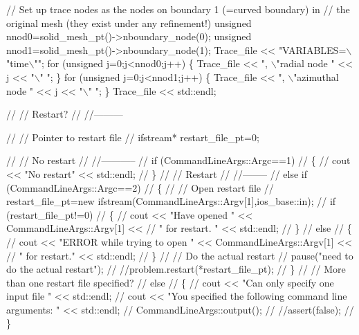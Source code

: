 \begin{DoxyCodeInclude}
{{{{{{{{{ \textcolor{comment}{// Set up trace nodes as the nodes on boundary 1 (=curved boundary) in }
 \textcolor{comment}{// the original mesh (they exist under any refinement!) }
 \textcolor{keywordtype}{unsigned} nnod0=solid\_mesh\_pt()->nboundary\_node(0);
 \textcolor{keywordtype}{unsigned} nnod1=solid\_mesh\_pt()->nboundary\_node(1);
 Trace\_file << \textcolor{stringliteral}{"VARIABLES=\(\backslash\)"time\(\backslash\)""};
 \textcolor{keywordflow}{for} (\textcolor{keywordtype}{unsigned} j=0;j<nnod0;j++)
  \{
   Trace\_file << \textcolor{stringliteral}{", \(\backslash\)"radial node "} << j << \textcolor{stringliteral}{"\(\backslash\)" "};
  \}
 \textcolor{keywordflow}{for} (\textcolor{keywordtype}{unsigned} j=0;j<nnod1;j++)
  \{
   Trace\_file << \textcolor{stringliteral}{", \(\backslash\)"azimuthal node "} << j << \textcolor{stringliteral}{"\(\backslash\)" "};
  \}
 Trace\_file << std::endl;



\textcolor{comment}{//  // Restart?}
\textcolor{comment}{//  //---------}

\textcolor{comment}{//  // Pointer to restart file}
\textcolor{comment}{//  ifstream* restart\_file\_pt=0;}

\textcolor{comment}{//  // No restart}
\textcolor{comment}{//  //-----------}
\textcolor{comment}{//  if (CommandLineArgs::Argc==1)}
\textcolor{comment}{//   \{}
\textcolor{comment}{//    cout << "No restart" << std::endl;}
\textcolor{comment}{//   \}}
\textcolor{comment}{//  // Restart}
\textcolor{comment}{//  //--------}
\textcolor{comment}{//  else if (CommandLineArgs::Argc==2)}
\textcolor{comment}{//   \{}
\textcolor{comment}{//    // Open restart file}
\textcolor{comment}{//    restart\_file\_pt=new ifstream(CommandLineArgs::Argv[1],ios\_base::in);}
\textcolor{comment}{//    if (restart\_file\_pt!=0)}
\textcolor{comment}{//     \{}
\textcolor{comment}{//      cout << "Have opened " << CommandLineArgs::Argv[1] << }
\textcolor{comment}{//       " for restart. " << std::endl;}
\textcolor{comment}{//     \}}
\textcolor{comment}{//    else}
\textcolor{comment}{//     \{}
\textcolor{comment}{//      cout << "ERROR while trying to open " << CommandLineArgs::Argv[1] << }
\textcolor{comment}{//       " for restart." << std::endl;}
\textcolor{comment}{//     \}}
\textcolor{comment}{//    // Do the actual restart}
\textcolor{comment}{//    pause("need to do the actual restart");}
\textcolor{comment}{//    //problem.restart(*restart\_file\_pt);}
\textcolor{comment}{//   \}}
\textcolor{comment}{//  // More than one restart file specified?}
\textcolor{comment}{//  else }
\textcolor{comment}{//   \{}
\textcolor{comment}{//    cout << "Can only specify one input file " << std::endl;}
\textcolor{comment}{//    cout << "You specified the following command line arguments: " << std::endl;}
\textcolor{comment}{//    CommandLineArgs::output();}
\textcolor{comment}{//    //assert(false);}
\textcolor{comment}{//   \}}


}}}}}}}}}
\end{DoxyCodeInclude}
